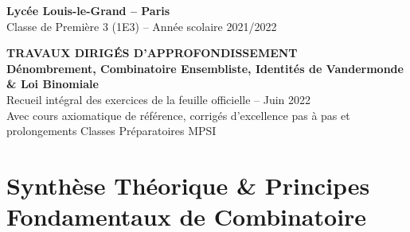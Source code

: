 \documentclass[11pt,a4paper]{article}
\begin{document}
\begin{center}
    {\LARGE \bfseries Lycée Louis-le-Grand -- Paris}\\[0.2cm]
    {\large Classe de Première 3 (1E3) -- Année scolaire 2021/2022}\\[0.3cm]
    \begin{tcolorbox}[colback=llglight,colframe=llgblue,arc=3mm,boxrule=1.2pt,center]
        \begin{center}
            {\Large \bfseries \color{llgblue} TRAVAUX DIRIGÉS D'APPROFONDISSEMENT}\\[0.15cm]
            {\large \bfseries Dénombrement, Combinatoire Ensembliste, Identités de Vandermonde \& Loi Binomiale}\\[0.2cm]
            \small Recueil intégral des exercices de la feuille officielle -- Juin 2022\\[0.1cm]
            \footnotesize Avec cours axiomatique de référence, corrigés d'excellence pas à pas et prolongements Classes Préparatoires MPSI
        \end{center}
    \end{tcolorbox}
\end{center}

\vspace{0.3cm}

\section*{Synthèse Théorique \& Principes Fondamentaux de Combinatoire}
\end{document}
